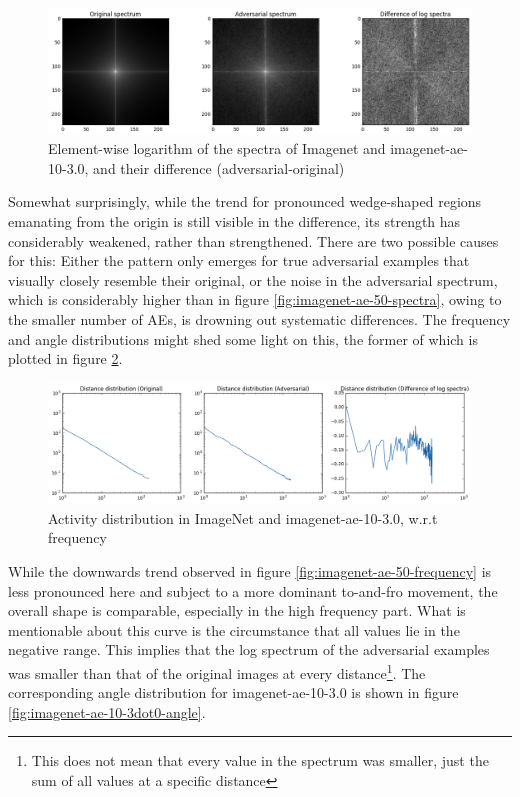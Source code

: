 \documentclass[11pt, a4paper]{article}
\begin{document}
\begin{figure}[h!tb]
	\centering
	\includegraphics[width=\textwidth]{images/spectra/imagenet-ae-10-3dot0-minconfidence-0dot9-maxorig-20000-spectra.png}
	\caption{Element-wise logarithm of the spectra of Imagenet and imagenet-ae-10-3.0, and their difference (adversarial-original)}
	\label{fig:imagenet-ae-10-3dot0-spectra}
\end{figure}

Somewhat surprisingly, while the trend for pronounced wedge-shaped regions emanating from the origin is still visible in the difference, its strength has considerably weakened, rather than strengthened. There are two possible causes for this: Either the pattern only emerges for true adversarial examples that visually closely resemble their original, or the noise in the adversarial spectrum, which is considerably higher than in figure \ref{fig:imagenet-ae-50-spectra}, owing to the smaller number of AEs, is drowning out systematic differences. The frequency and angle distributions might shed some light on this, the former of which is plotted in figure \ref{fig:imagenet-ae-10-3dot0-frequency}.

\begin{figure}[h!tb]
	\centering
	\includegraphics[width=\textwidth]{images/spectra/imagenet-ae-10-3dot0-minconfidence-0dot9-maxorig-20000-distance-158-bins.png}
	\caption{Activity distribution in ImageNet and imagenet-ae-10-3.0, w.r.t frequency}
	\label{fig:imagenet-ae-10-3dot0-frequency}
\end{figure}

While the downwards trend observed in figure \ref{fig:imagenet-ae-50-frequency} is less pronounced here and subject to a more dominant to-and-fro movement, the overall shape is comparable, especially in the high frequency part. What is mentionable about this curve is the circumstance that all values lie in the negative range. This implies that the log spectrum of the adversarial examples was smaller than that of the original images at every distance\footnote{This does not mean that every value in the spectrum was smaller, just the sum of all values at a specific distance}. The corresponding angle distribution for imagenet-ae-10-3.0 is shown in figure \ref{fig:imagenet-ae-10-3dot0-angle}.
\end{document}
